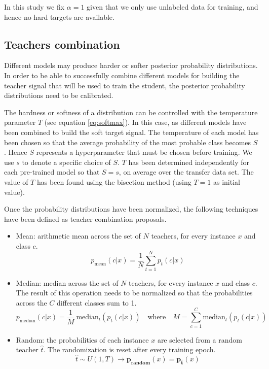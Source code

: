 In this study we fix $\alpha=1$ given that we only use unlabeled data for training, and hence no hard targets are available.

\subsection{Teachers combination} \label{sec:distillation_teachers_comb}
Different models may produce harder or softer posterior probability distributions. In order to be able to successfully combine  different models for building the teacher signal that will be used to train the student, the posterior probability distributions need to be calibrated.

The hardness or softness of a distribution can be controlled with the temperature parameter $T$ (see equation \ref{eq:softmax}). In this case, as different models have been combined to build the soft target signal. The temperature of each model has been chosen so that the average probability of the most probable class becomes $S$. Hence $S$ represents a hyperparameter that must be chosen before training. We use $s$ to denote a specific choice of $S$.  $T$ has been determined independently for each pre-trained model so that $S=s$, on average over the transfer data set. The value of $T$ has been found using the bisection method (using $T=1$ as initial value).

Once the probability distributions have been normalized, the following techniques have been defined as teacher combination proposals.

\begin{itemize}
 	\item Mean: arithmetic mean across the set of $N$ teachers, for every instance $x$ and class $c$.
 	$$p_{\text{mean}}(c|x) = \frac{1}{N} \sum_{t=1}^N p_{t}(c|x)$$
 	\item Median: median across the set of $N$ teachers, for every instance $x$ and class $c$. The result of this operation needs to be normalized so that the probabilities across the $C$ different classes sum to 1. $$p_{\text{median}}(c|x) = \frac{1}{M} \ \text{median}_t( p_{t}(c|x)) \quad \text{where} \quad M = \sum_{c=1}^C  \text{median}_t( p_{t}(c|x))$$
 	\item Random: the probabilities of each instance $x$ are selected from a random teacher $\hat{t}$. The randomization is reset after every training epoch.
 	$$\hat{t} \sim U(1, T) \rightarrow \mathbf{p_\text{random}}(x) = \mathbf{p_{\hat{t}}}(x)$$
	\end{itemize}

